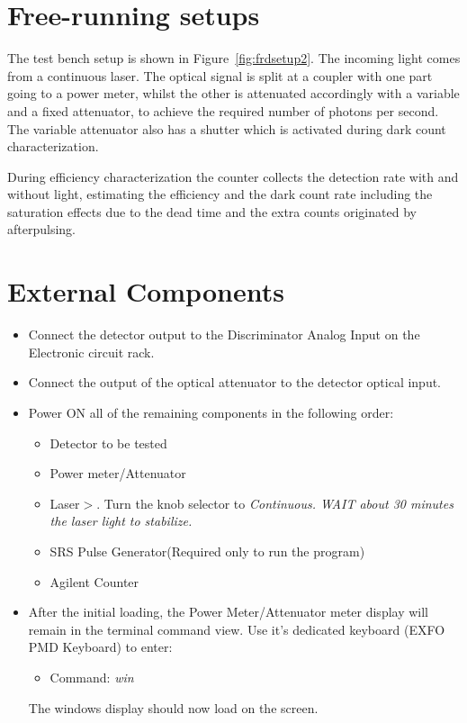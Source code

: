 \documentclass{article}
\begin{document}
\section{Free-running setups}\label{Sec:free-running}
The test bench setup is shown in Figure~\ref{fig:frdsetup2}. The incoming light comes from a continuous laser. The optical signal is split at a coupler with one part going to a power meter, whilst the other is attenuated accordingly with a variable and a fixed attenuator, to achieve the required number of photons per second. The variable attenuator also has a shutter which is activated during dark count characterization.

During efficiency characterization the counter collects the detection rate with and without light, estimating the efficiency and the dark count rate including the saturation effects due to the dead time and the extra counts originated by afterpulsing. 



\section{External Components}

\begin{itemize}

\item
Connect the detector output to the Discriminator Analog Input on the Electronic circuit rack.

\item
Connect the output of the optical attenuator to the detector optical input. 

\item
Power ON all of the remaining components in the following order:

\begin{itemize}
\item{Detector to be tested}
\item{Power meter/Attenuator}
\item{Laser$>$. Turn the knob selector to \it{Continuous}. WAIT about 30 minutes the laser light to stabilize.}
\item{SRS Pulse Generator}(Required only to run the program)
\item{Agilent Counter}
\end{itemize}

\item
After the initial loading, the Power Meter/Attenuator meter display will remain in the terminal command view. Use it's dedicated keyboard (EXFO PMD Keyboard) to enter:

\begin{itemize}

\item
Command: \emph{win}
\end{itemize}
The windows display should now load on the screen. 

\end{itemize}
\end{document}
